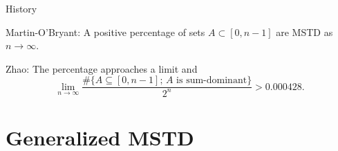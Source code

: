\documentclass[11pt]{beamer}
\begin{document}

\begin{frame}{History}

\alert{Martin-O'Bryant}: A positive percentage of sets $A \subset [0, n-1]$ are MSTD as $n \to \infty$.

\pause
\bigskip

\alert{Zhao}: The percentage approaches a limit and
$$\lim_{n\to\infty} \frac{\#\{A\subseteq [0,n-1];\, A \text{ is sum-dominant}\}}{2^n}> 0.000428.$$

\end{frame}







\section{Generalized MSTD} %
\end{document}
